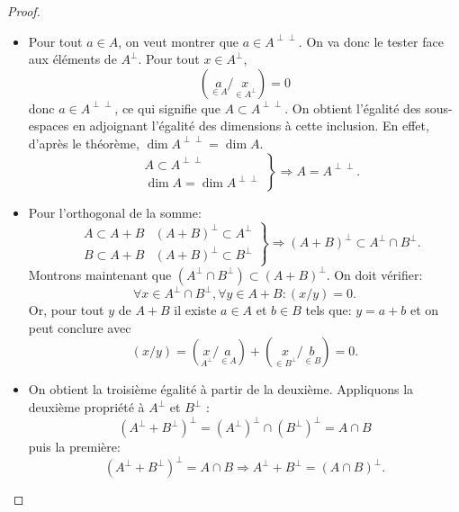 \begin{proof}
\begin{itemize}
\item Pour tout $a \in A$, on veut montrer que $a \in A^{\perp\perp}$. On va donc le tester face aux éléments de $A^{\perp}$. Pour tout $x \in A^{\perp}$, 
\begin{displaymath}
 (\underset{\in A}{a} / \underset{\in A^{\perp}}{x}) = 0
\end{displaymath}
donc $a \in A^{\perp\perp}$, ce qui signifie que $A \subset A^{\perp\perp}$.\newline
On obtient l'égalité des sous-espaces en adjoignant l'égalité des dimensions à cette inclusion. En effet, d'après le théorème, $\dim A^{\perp\perp} = \dim A$.
\begin{displaymath}
 \left.
\begin{aligned}
&A \subset A^{\perp\perp} \\
&\dim A = \dim A^{\perp \perp}
\end{aligned}
 \right\rbrace \Rightarrow A = A^{\perp \perp} .
\end{displaymath}
\item Pour l'orthogonal de la somme:
\begin{displaymath}
 \left. 
\begin{aligned}
&A \subset A + B & (A+B)^{\perp} \subset A^{\perp} \\
&B \subset A + B & (A+B)^{\perp} \subset B^{\perp}
\end{aligned}
\right\rbrace 
\Rightarrow (A+B)^{\perp} \subset A^{\perp} \cap B^{\perp} .
\end{displaymath}
Montrons maintenant que $( A^{\perp} \cap B^{\perp} ) \subset (A+B)^{\perp}$. On doit vérifier:
\[
\forall x \in A^{\perp} \cap B^{\perp}, \forall y \in A+B : (x/y) = 0 .
\]
Or, pour tout $y$ de $A+B$ il existe $a \in A$ et $b \in B$ tels que: $y = a + b$ et on peut conclure avec
\[
(x/y) = (\underset{A^{\perp}}{x}/\underset{\in A}{a}) + (\underset{\in B^{\perp}}{x} / \underset{\in B}{b}) = 0 .
\]
\item On obtient la troisième égalité à partir de la deuxième. Appliquons la deuxième propriété à $A^{\perp}$ et $B^{\perp}$ :
\[
(A^{\perp} + B^{\perp})^{\perp} = (A^{\perp})^{\perp} \cap (B^{\perp})^{\perp} = A \cap B
\]
puis la première:
\begin{displaymath}
(A^{\perp} + B^{\perp})^{\perp} = A \cap B 
 \Rightarrow A^{\perp} + B^{\perp} = (A \cap B)^{\perp} .
\end{displaymath}
\end{itemize}
\end{proof}

